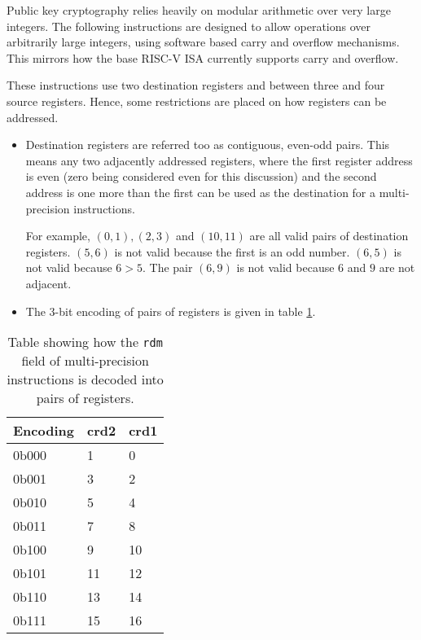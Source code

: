 Public key cryptography relies heavily on modular arithmetic over very
large integers. The following instructions are designed to allow
operations over arbitrarily large integers, using software based carry
and overflow mechanisms. This mirrors how the base RISC-V ISA currently
supports carry and overflow.

These instructions use two destination registers and between three
and four source registers. Hence, some restrictions are placed on how
registers can be addressed.

\begin{itemize}
\item
Destination registers are referred too as contiguous, even-odd pairs.
This means any two adjacently addressed registers, where the
first register address is even (zero being considered even for this
discussion) and the second address is one more than the first can be
used as the destination for a multi-precision instructions.

For example, $(0,1), (2,3)$ and $(10,11)$ are all valid
pairs of destination registers.
$(5,6)$ is not valid because the first
is an odd number. $(6,5)$ is not valid because $6 > 5$.
The pair $(6,9)$
is not valid because $6$ and $9$ are not adjacent.

\item
The 3-bit encoding of pairs of registers is given in table 
\ref{tab:rdm-encodings}.
\end{itemize}

\begin{table}
\centering
\begin{tabular}{lll}
\hline
Encoding & crd2 & crd1 \\ \hline
0b000      & 1    & 0    \\
0b001      & 3    & 2    \\
0b010      & 5    & 4    \\
0b011      & 7    & 8    \\
0b100      & 9    & 10   \\
0b101      & 11   & 12   \\
0b110      & 13   & 14   \\
0b111      & 15   & 16   \\ \hline
\end{tabular}
\caption{
    Table showing how the {\tt rdm} field of multi-precision instructions
    is decoded into pairs of registers.
}
\label{tab:rdm-encodings}
\end{table}


